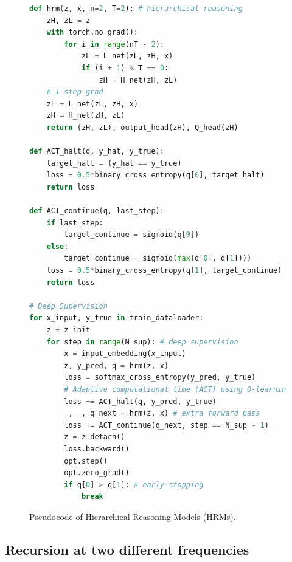 \documentclass{article}
\theoremstyle{plain}
\theoremstyle{definition}
\theoremstyle{remark}
\begin{document}
\begin{figure}[h]
  \centering
    \begin{lstlisting}[language=python]
def hrm(z, x, n=2, T=2): # hierarchical reasoning
    zH, zL = z
    with torch.no_grad():
        for i in range(nT - 2):
            zL = L_net(zL, zH, x)
            if (i + 1) % T == 0:
                zH = H_net(zH, zL)
    # 1-step grad
    zL = L_net(zL, zH, x)
    zH = H_net(zH, zL)
    return (zH, zL), output_head(zH), Q_head(zH)

def ACT_halt(q, y_hat, y_true):
    target_halt = (y_hat == y_true)
    loss = 0.5*binary_cross_entropy(q[0], target_halt)
    return loss

def ACT_continue(q, last_step):
    if last_step:
        target_continue = sigmoid(q[0])
    else:
        target_continue = sigmoid(max(q[0], q[1])))
    loss = 0.5*binary_cross_entropy(q[1], target_continue)
    return loss

# Deep Supervision
for x_input, y_true in train_dataloader:
    z = z_init
    for step in range(N_sup): # deep supervision
        x = input_embedding(x_input)
        z, y_pred, q = hrm(z, x)
        loss = softmax_cross_entropy(y_pred, y_true)
        # Adaptive computational time (ACT) using Q-learning
        loss += ACT_halt(q, y_pred, y_true)
        _, _, q_next = hrm(z, x) # extra forward pass
        loss += ACT_continue(q_next, step == N_sup - 1)
        z = z.detach()
        loss.backward()
        opt.step()
        opt.zero_grad()
        if q[0] > q[1]: # early-stopping
            break
    \end{lstlisting}
  \caption{Pseudocode of Hierarchical Reasoning Models (HRMs).}
  \label{fig:pseudocode}
  \vspace{-5pt}
\end{figure}

\subsection{Recursion at two different frequencies}
\end{document}
